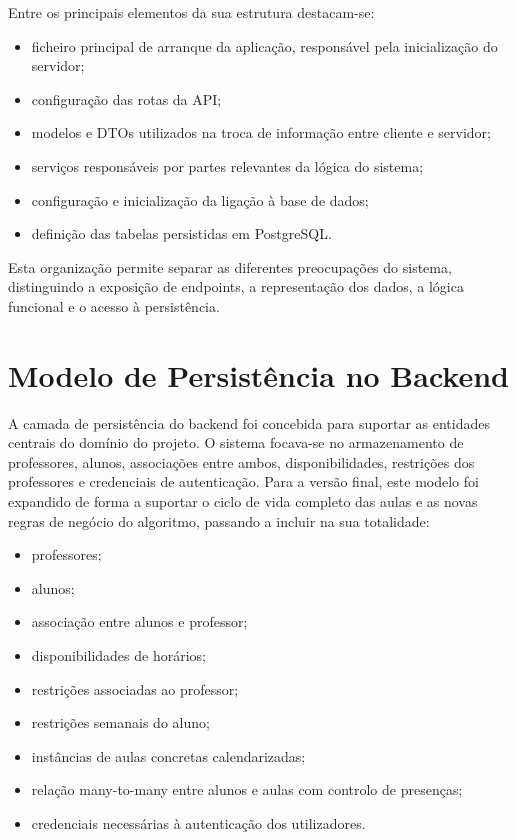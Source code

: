 Entre os principais elementos da sua estrutura destacam-se:

\begin{itemize}
    \item ficheiro principal de arranque da aplicação, responsável pela inicialização do servidor;
    \item configuração das rotas da API;
    \item modelos e DTOs utilizados na troca de informação entre cliente e servidor;
    \item serviços responsáveis por partes relevantes da lógica do sistema;
    \item configuração e inicialização da ligação à base de dados;
    \item definição das tabelas persistidas em PostgreSQL.
\end{itemize}

Esta organização permite separar as diferentes preocupações do sistema, distinguindo a exposição de endpoints, a representação dos dados,
a lógica funcional e o acesso à persistência.

\section{Modelo de Persistência no Backend}

A camada de persistência do backend foi concebida para suportar as entidades centrais do domínio do projeto. O sistema focava-se no armazenamento de professores, alunos, associações entre ambos, disponibilidades, restrições dos professores e credenciais de autenticação. Para a versão final, este modelo foi expandido de forma a suportar o ciclo de vida completo das aulas e as novas regras de negócio do algoritmo, passando a incluir na sua totalidade:

\begin{itemize}
    \item professores;
    \item alunos;
    \item associação entre alunos e professor;
    \item disponibilidades de horários;
    \item restrições associadas ao professor;
    \item restrições semanais do aluno;
    \item instâncias de aulas concretas calendarizadas;
    \item relação many-to-many entre alunos e aulas com controlo de presenças;
    \item credenciais necessárias à autenticação dos utilizadores.
\end{itemize}

